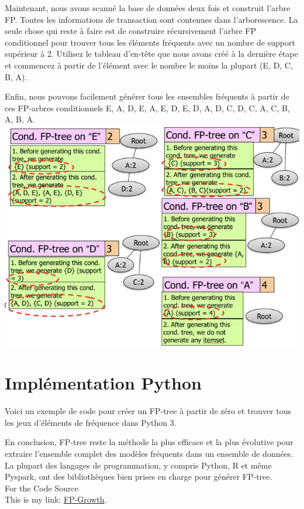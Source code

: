 \documentclass[a4paper,12pt]{article}
\begin{document}
\begin{frame}
    {}

\end{frame}

\pagebreak

Maintenant, nous avons scanné la base de données deux fois et construit l'arbre FP. Toutes les informations de transaction sont contenues dans l'arborescence. La seule chose qui reste à faire est de construire récursivement l'arbre FP conditionnel pour trouver tous les éléments fréquents avec un nombre de support supérieur à 2. Utilisez le tableau d'en-tête que nous avons créé à la dernière étape et commencez à partir de l'élément avec le nombre le moins la plupart (E, D, C, B, A).
\begin{frame}
    {}

\end{frame}

\pagebreak

Enfin, nous pouvons facilement générer tous  les ensembles fréquents à partir de ces FP-arbres conditionnels {E}, {A, D, E}, {A, E}, {D, E}, {D}, {A, D}, { C, D}, {C}, {A, C}, {B}, {A, B}, {A}.
\includegraphics[width=\textwidth]{four}

\section{Implémentation Python}
Voici un exemple de code pour créer un FP-tree à partir de zéro et trouver tous les jeux d'éléments de fréquence dans Python 3.

En conclusion, FP-tree reste la méthode la plus efficace et la plus évolutive pour extraire l'ensemble complet des modèles fréquents dans un ensemble de données. La plupart des langages de programmation, y compris Python, R et même Pyspark, ont des bibliothèques bien prises en charge pour générer FP-tree.\\
For the Code Source \\

This is my link: \href{https://github.com/IlyesBenarroum/Latex-FDD/blob/master/Src/source.py}{FP-Growth}.
\end{document}
